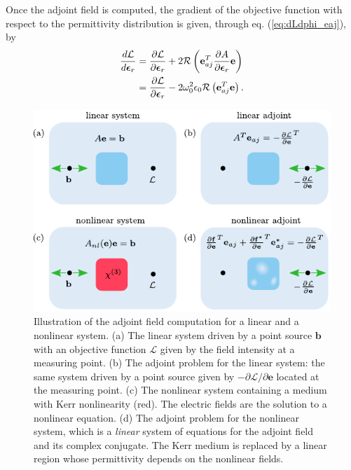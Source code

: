 Once the adjoint field is computed, the gradient of the objective function with respect to the permittivity distribution is given, through eq. (\ref{eq:dLdphi_eaj}), by 
%
\begin{align}
\frac{d\mathcal{L}}{d\bm{\epsilon}_r} &= \frac{\partial\mathcal{L}}{\partial \bm{\epsilon}_r} + 2\mathcal{R}\left(
\mathbf{e}_{aj}^T
\frac{\partial A} { \partial \bm{\epsilon}_r} \mathbf{e} \right) \\
 &= \frac{\partial\mathcal{L}}{\partial \bm{\epsilon}_r} - 2 \omega_0^2 \epsilon_0 \mathcal{R}\left(
\mathbf{e}_{aj}^T
 \mathbf{e} \right).
\label{eq:dLdphi_lin}
\end{align}
%

\begin{figure}[t]
\includegraphics[width=\columnwidth]{figures/angler_avm_illustration_2.pdf}
\caption{\label{fig:avm} Illustration of the adjoint field computation for a linear and a nonlinear system. (a) The linear system driven by a point source $\mathbf{b}$ with an objective function $\mathcal{L}$  given by the field intensity at a measuring point. (b)  The adjoint problem for the linear system: the same system driven by a point source given by $-\partial\mathcal{L}/\partial \mathbf{e}$ located at the measuring point.  (c) The nonlinear system containing a medium with Kerr nonlinearity (red).  The electric fields are the solution to a nonlinear equation. (d) The adjoint problem for the nonlinear system, which is a \textit{linear} system of equations for the adjoint field and its complex conjugate. The Kerr medium is replaced by a linear region whose permittivity depends on the nonlinear fields.}
\end{figure}

